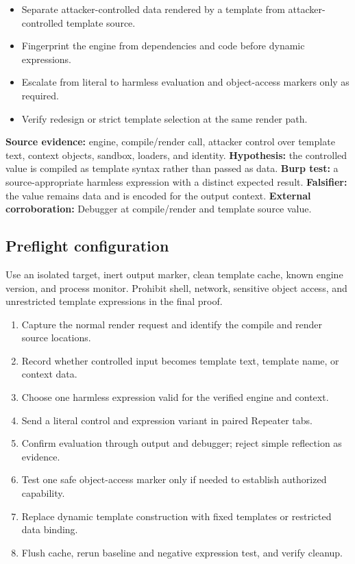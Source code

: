 \documentclass[11pt]{article}
\newcommand{\weekfield}[2]{%
  \Needspace{5\baselineskip}
  \subsection*{#1}
  #2
}
\newcommand{\externalproof}[1]{\textbf{External corroboration:} #1}
\begin{document}
\begin{objectivebox}
\begin{itemize}
  \item Separate attacker-controlled data rendered by a template from attacker-controlled template source.
  \item Fingerprint the engine from dependencies and code before dynamic expressions.
  \item Escalate from literal to harmless evaluation and object-access markers only as required.
  \item Verify redesign or strict template selection at the same render path.
\end{itemize}
\end{objectivebox}

\begin{bridgebox}
\textbf{Source evidence:} engine, compile/render call, attacker control over
template text, context objects, sandbox, loaders, and identity. \textbf{Hypothesis:}
the controlled value is compiled as template syntax rather than passed as data.
\textbf{Burp test:} a source-appropriate harmless expression with a distinct
expected result. \textbf{Falsifier:} the value remains data and is encoded for the
output context. \externalproof{Debugger at compile/render and template source
value.}
\end{bridgebox}

\weekfield{Preflight configuration}{Use an isolated target, inert output marker,
clean template cache, known engine version, and process monitor. Prohibit shell,
network, sensitive object access, and unrestricted template expressions in the
final proof.}

\begin{procedurebox}
\begin{enumerate}
  \item Capture the normal render request and identify the compile and render source locations.
  \item Record whether controlled input becomes template text, template name, or context data.
  \item Choose one harmless expression valid for the verified engine and context.
  \item Send a literal control and expression variant in paired Repeater tabs.
  \item Confirm evaluation through output and debugger; reject simple reflection as evidence.
  \item Test one safe object-access marker only if needed to establish authorized capability.
  \item Replace dynamic template construction with fixed templates or restricted data binding.
  \item Flush cache, rerun baseline and negative expression test, and verify cleanup.
\end{enumerate}
\end{procedurebox}
\end{document}
